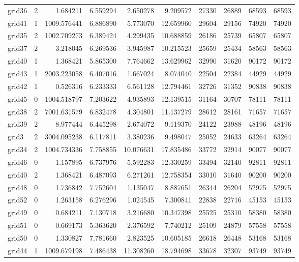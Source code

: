 \begin{longtable}{|l|r|r|r|r|r|r|r|r|r|}
grid36 & 2 & 1.684211 & 6.559294 & 2.650278 & 9.209572 & 27330 & 26889 & 68593 & 68593 \\
grid41 & 1 & 1009.576441 & 6.886890 & 5.773070 & 12.659960 & 29604 & 29156 & 74920 & 74920 \\
grid35 & 2 & 1002.709273 & 6.389424 & 4.299435 & 10.688859 & 26186 & 25739 & 65807 & 65807 \\
grid37 & 2 & 3.218045 & 6.269536 & 3.945987 & 10.215523 & 25659 & 25434 & 58563 & 58563 \\
grid40 & 1 & 1.368421 & 5.865300 & 7.764662 & 13.629962 & 32990 & 31620 & 90172 & 90172 \\
grid43 & 1 & 2003.223058 & 6.407016 & 1.667024 & 8.074040 & 22504 & 22384 & 44929 & 44929 \\
grid42 & 1 & 0.526316 & 6.233333 & 6.561128 & 12.794461 & 32726 & 31352 & 90838 & 90838 \\
grid45 & 0 & 1004.518797 & 7.203622 & 4.935893 & 12.139515 & 31164 & 30707 & 78111 & 78111 \\
grid38 & 2 & 7001.631579 & 6.832478 & 4.304801 & 11.137279 & 28612 & 28161 & 71657 & 71657 \\
grid39 & 2 & 8.977444 & 6.445298 & 2.674072 & 9.119370 & 24122 & 23988 & 48196 & 48196 \\
grid3 & 2 & 3004.095238 & 6.117811 & 3.380236 & 9.498047 & 25052 & 24633 & 63264 & 63264 \\
grid34 & 2 & 1004.734336 & 7.758855 & 10.076631 & 17.835486 & 33772 & 32914 & 90077 & 90077 \\
grid46 & 0 & 1.157895 & 6.737976 & 5.592283 & 12.330259 & 33494 & 32140 & 92811 & 92811 \\
grid40 & 2 & 1.368421 & 6.487093 & 6.271261 & 12.758354 & 33010 & 31640 & 90200 & 90200 \\
grid48 & 0 & 1.736842 & 7.752604 & 1.135047 & 8.887651 & 26344 & 26204 & 52975 & 52975 \\
grid52 & 0 & 1.263158 & 6.276296 & 1.024545 & 7.300841 & 22838 & 22716 & 45153 & 45153 \\
grid49 & 0 & 0.684211 & 7.130718 & 3.216680 & 10.347398 & 25525 & 25310 & 58380 & 58380 \\
grid51 & 0 & 0.669173 & 5.363620 & 2.376592 & 7.740212 & 25109 & 24879 & 57558 & 57558 \\
grid50 & 0 & 1.330827 & 7.781660 & 2.823525 & 10.605185 & 26618 & 26448 & 53168 & 53168 \\
grid44 & 1 & 1009.679198 & 7.486438 & 11.308260 & 18.794698 & 33678 & 32307 & 93749 & 93749 \\

\end{longtable}

